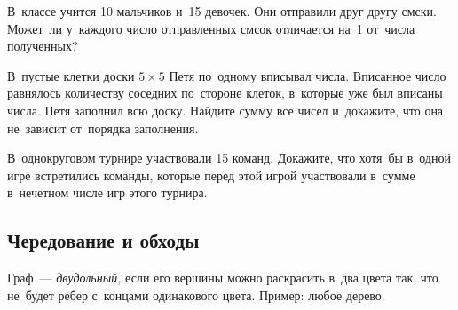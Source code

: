 \begin{problems}


\item
В~классе учится 10 мальчиков и~15 девочек.
Они отправили друг другу смски.
Может~ли у~каждого число отправленных смсок отличается на~1 от~числа
полученных?

\item
В~пустые клетки доски $5 \times 5$ Петя по~одному вписывал числа.
Вписанное число равнялось количеству соседних по~стороне клеток, в~которые уже
был вписаны числа.
Петя заполнил всю доску.
Найдите сумму все чисел и~докажите, что она не~зависит от~порядка заполнения.

\item
В~однокруговом турнире участвовали 15 команд.
Докажите, что хотя~бы в~одной игре встретились команды, которые перед этой
игрой участвовали в~сумме в~нечетном числе игр этого турнира.

\end{problems}

\subsection*{Чередование и обходы}

Граф~--- \emph{двудольный,} если его вершины можно раскрасить в~два цвета так,
что не~будет ребер с~концами одинакового цвета.
Пример: любое дерево.


